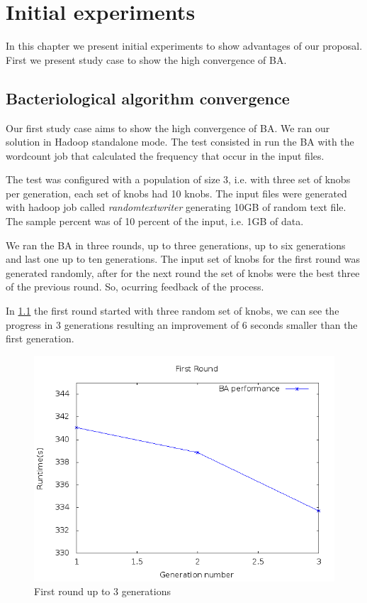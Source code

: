 \chapter{Initial experiments} %
\label{cha:experiments}

In this chapter we present initial experiments to show advantages of our proposal.
First we present study case to show the high convergence of BA.

\section{Bacteriological algorithm convergence}

Our first study case aims to show the high convergence of BA. We ran our solution
in Hadoop standalone mode. The test consisted in run the BA with the wordcount job
that calculated the frequency that occur in the input files.

The test was configured with a population of size 3, i.e. with three set of knobs
per generation, each set of knobs had 10 knobs. The input files were generated with
hadoop job called {\it randomtextwriter} generating 10GB of random text file. The
sample percent was of 10 percent of the input, i.e. 1GB of data.

We ran the BA in three rounds, up to three generations, up to six generations and
last one up to ten generations. The input set of knobs for the first round was
generated randomly, after for the next round the set of knobs were the best three
of the previous round. So, ocurring feedback of the process.

In \ref{fig:3gen} the first round started with three random set of knobs, we can
see the progress in 3 generations resulting an improvement of 6 seconds smaller
than the first generation.
\\
\begin{figure}[htbp]
    \centering
	\includegraphics[scale=0.6]{graphics/img/3gen.png}
    \caption{First round up to 3 generations} \label{fig:3gen}
\end{figure}
\\
\\

